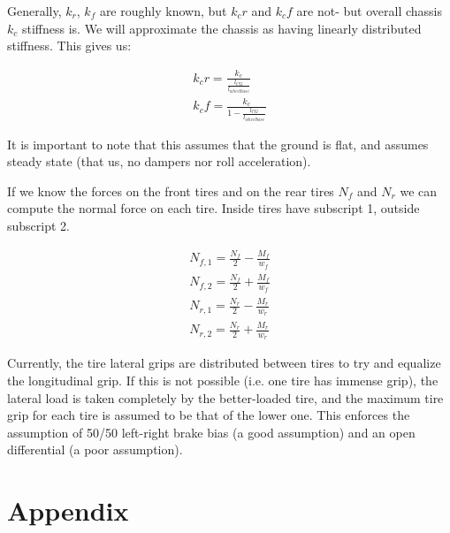 \documentclass{article}
\begin{document}
Generally, $k_r$, $k_f$ are roughly known, but $k_cr$ and $k_cf$ are not- but overall chassis $k_c$ stiffness is. We will approximate the chassis as having linearly distributed stiffness. This gives us:

\begin{align}
	k_cr = \frac{k_c}{\frac{l_{CG}}{l_{wheelbase}}}\\
	k_cf = \frac{k_c}{1 - \frac{l_{CG}}{l_{wheelbase}}}
\end{align}

It is important to note that this assumes that the ground is flat, and assumes steady state (that us, no dampers nor roll acceleration).

If we know the forces on the front tires and on the rear tires $N_f$ and $N_r$ we can compute the normal force on each tire. Inside tires have subscript 1, outside subscript 2.

\begin{align}
	N_{f,1} = \frac{N_{f}}{2} - \frac{M_f}{w_f} \\
	N_{f,2} = \frac{N_{f}}{2} + \frac{M_f}{w_f} \\
	N_{r,1} = \frac{N_{r}}{2} - \frac{M_r}{w_r} \\
	N_{r,2} = \frac{N_{r}}{2} + \frac{M_r}{w_r}
\end{align}

Currently, the tire lateral grips are distributed between tires to try and equalize the longitudinal grip. If this is not possible (i.e. one tire has immense grip), the lateral load is taken completely by the better-loaded tire, and the maximum tire grip for each tire is assumed to be that of the lower one. This enforces the assumption of 50/50 left-right brake bias (a good assumption) and an open differential (a poor assumption).





\section{Appendix}


\end{document}
